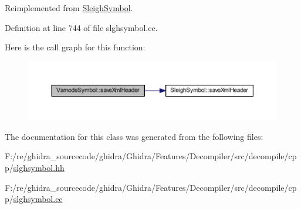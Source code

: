 Reimplemented from \mbox{\hyperlink{class_sleigh_symbol_ac501be7c584bc0568c29fb95910962e9}{Sleigh\+Symbol}}.



Definition at line 744 of file slghsymbol.\+cc.

Here is the call graph for this function\+:
\nopagebreak
\begin{figure}[H]
\begin{center}
\leavevmode
\includegraphics[width=350pt]{class_varnode_symbol_a897bc5a3be293e1067070b26eb5fa14b_cgraph}
\end{center}
\end{figure}


The documentation for this class was generated from the following files\+:\begin{DoxyCompactItemize}
\item 
F\+:/re/ghidra\+\_\+sourcecode/ghidra/\+Ghidra/\+Features/\+Decompiler/src/decompile/cpp/\mbox{\hyperlink{slghsymbol_8hh}{slghsymbol.\+hh}}\item 
F\+:/re/ghidra\+\_\+sourcecode/ghidra/\+Ghidra/\+Features/\+Decompiler/src/decompile/cpp/\mbox{\hyperlink{slghsymbol_8cc}{slghsymbol.\+cc}}\end{DoxyCompactItemize}
